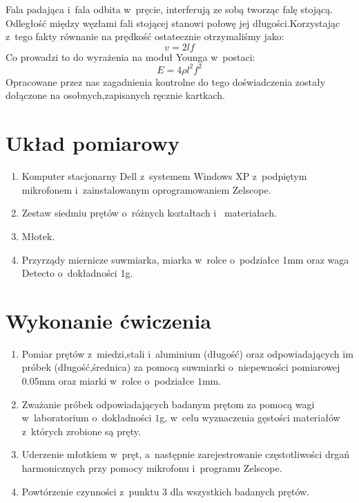 \documentclass{fizraport}
\begin{document}
    Fala padająca i~fala odbita w~pręcie, interferują ze sobą tworząc falę stojącą.
    Odległość między węzłami fali stojącej stanowi połowę jej długości.Korzystając z~tego fakty równanie na prędkość ostatecznie
    otrzymaliśmy jako:
    \begin{equation*}
        v = 2 lf
    \end{equation*}
%
    Co prowadzi to do wyrażenia na moduł Younga w~postaci:
    \begin{equation}
        E = 4\rho l^2 f^2
        \label{eq:S4YoungMod}
    \end{equation}
%
    Opracowane przez nas zagadnienia kontrolne do tego doświadczenia zostały dołączone na osobnych,zapisanych ręcznie kartkach.
\newpage %
\addtocounter{page}{2}%

\section{Układ pomiarowy}
    \begin{enumerate}
    		\item Komputer stacjonarny Dell z~systemem Windows XP z~podpiętym mikrofonem i~zainstalowanym oprogramowaniem Zelscope.
    		\item Zestaw siedmiu prętów o~różnych kształtach i ~materiałach.
    		\item Młotek.
    		\item Przyrządy miernicze suwmiarka, miarka w~rolce o~podziałce 1mm oraz waga Detecto o~dokładności 1g.
    \end{enumerate}
    	
\section{Wykonanie ćwiczenia}
    \begin{enumerate}
        \item Pomiar prętów z~miedzi,stali i~aluminium (długość) oraz odpowiadających im próbek (długość,średnica) za pomocą suwmiarki o~niepewności pomiarowej $0.05$mm oraz miarki w~rolce o~podziałce $1$mm.
        \item Zważanie próbek odpowiadających badanym prętom za pomocą wagi w~laboratorium o~dokładności $1$g, w~celu wyznaczenia gęstości materiałów z~których zrobione są pręty.
        \item Uderzenie młotkiem w~pręt, a~następnie zarejestrowanie częstotliwości drgań harmonicznych przy pomocy mikrofonu i~programu Zelscope.
        \item Powtórzenie czynności z~punktu 3 dla wszystkich badanych prętów.
    \end{enumerate}
\end{document}
